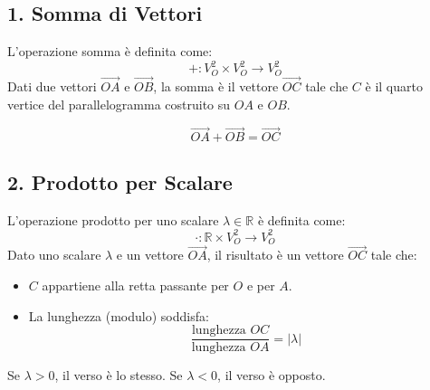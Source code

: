 \subsection{1. Somma di Vettori}
L'operazione somma è definita come:
\[ + : V_O^2 \times V_O^2 \longrightarrow V_O^2 \]
Dati due vettori $\overrightarrow{OA}$ e $\overrightarrow{OB}$, la somma è il vettore $\overrightarrow{OC}$ tale che $C$ è il quarto vertice del parallelogramma costruito su $OA$ e $OB$.

\[ \overrightarrow{OA} + \overrightarrow{OB} = \overrightarrow{OC} \]

\begin{center}
\end{center}

\subsection{2. Prodotto per Scalare}
L'operazione prodotto per uno scalare $\lambda \in \mathbb{R}$ è definita come:
\[ \cdot : \mathbb{R} \times V_O^2 \longrightarrow V_O^2 \]
Dato uno scalare $\lambda$ e un vettore $\overrightarrow{OA}$, il risultato è un vettore $\overrightarrow{OC}$ tale che:
\begin{itemize}
    \item $C$ appartiene alla retta passante per $O$ e per $A$.
    \item La lunghezza (modulo) soddisfa:
    \[ \frac{\text{lunghezza } OC}{\text{lunghezza } OA} = |\lambda| \]
\end{itemize}
Se $\lambda > 0$, il verso è lo stesso. Se $\lambda < 0$, il verso è opposto.

